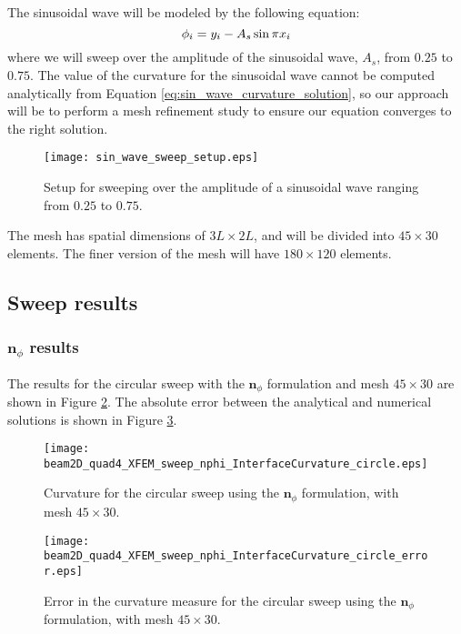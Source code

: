 The sinusoidal wave will be modeled by the following equation:
%
\begin{equation}
	\centering
	\label{eq:level_set_sin_wave}
	\phi_{i} = y_{i} - A_{s} \sin \pi x_{i}
\end{equation}
%
where we will sweep over the amplitude of the sinusoidal wave, $A_{s}$, from $0.25$ to $0.75$. The value of the curvature for the sinusoidal wave cannot be computed analytically from Equation \ref{eq:sin_wave_curvature_solution}, so our approach will be to perform a mesh refinement study to ensure our equation converges to the right solution.
%
\begin{figure}[H]
	\centering
	\texttt{[image: sin\_wave\_sweep\_setup.eps]}
	\caption{Setup for sweeping over the amplitude of a sinusoidal wave ranging from $0.25$ to $0.75$.}
	\label{fig:sin_wave_sweep_setup}
\end{figure}
%
The mesh has spatial dimensions of $3L \times 2L$, and will be divided into $45 \times 30$ elements. The finer version of the mesh will have $180 \times 120$ elements.


\subsection{Sweep results}
\label{sec:sweep_results}


\subsubsection{$\mathbf{n}_{\phi}$ results}
\label{sec:nphi_results}

The results for the circular sweep with the $\mathbf{n}_{\phi}$ formulation and mesh $45 \times 30$ are shown in Figure \ref{fig:beam2D_quad4_XFEM_sweep_nphi_InterfaceCurvature_circle}. The absolute error between the analytical and numerical solutions is shown in Figure \ref{fig:beam2D_quad4_XFEM_sweep_nphi_InterfaceCurvature_circle_error}.
%
\begin{figure}[H]
	\centering
	\texttt{[image: beam2D\_quad4\_XFEM\_sweep\_nphi\_InterfaceCurvature\_circle.eps]}
	\caption{Curvature for the circular sweep using the $\mathbf{n}_{\phi}$ formulation, with mesh $45 \times 30$.}
	\label{fig:beam2D_quad4_XFEM_sweep_nphi_InterfaceCurvature_circle}
\end{figure}
%
\begin{figure}[H]
	\centering
	\texttt{[image: beam2D\_quad4\_XFEM\_sweep\_nphi\_InterfaceCurvature\_circle\_error.eps]}
	\caption{Error in the curvature measure for the circular sweep using the $\mathbf{n}_{\phi}$ formulation, with mesh $45 \times 30$.}
	\label{fig:beam2D_quad4_XFEM_sweep_nphi_InterfaceCurvature_circle_error}
\end{figure}

